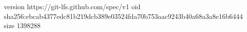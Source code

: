 version https://git-lfs.github.com/spec/v1
oid sha256:ebcab4377edc81b219dcb389e03524fda70b753aac9243b40a68a3a8e16b6444
size 1398288
